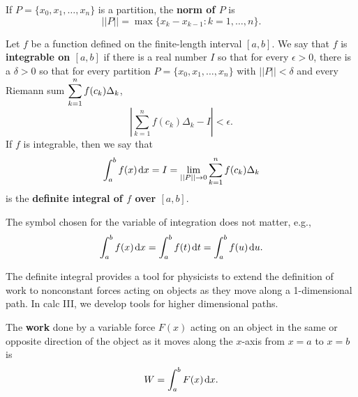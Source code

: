 \begin{definition}
If $P=\{x_0,x_1,\dots, x_n\}$ is a partition, the \textbf{norm of $P$} is 
\begin{equation*}
||P|| = \max\{x_k-x_{k-1} : k=1,\dots, n\}.
\end{equation*}
\end{definition}

\begin{definition}
Let $f$ be a function defined on the finite-length interval $[a,b]$.
We say that $f$ is \textbf{integrable on $[a,b]$} if there is a real number $I$ so that for every $\epsilon>0$, there is a $\delta>0$ so that for every partition $P=\{x_0,x_1,\dots, x_n\}$ with $||P||<\delta$ and every Riemann sum $\displaystyle\sum_{k=1}^nf(c_k)\Delta_k$,
\begin{equation*}
\left|\sum_{k=1}^nf(c_k)\Delta_k - I\right| <\epsilon.
\end{equation*}
If $f$ is integrable, then we say that
\begin{equation*}
\int_a^bf(x)\mkern 2mu \mathrm{d} x = I = \lim_{||P||\to 0}\sum_{k=1}^nf(c_k)\Delta_k
\end{equation*}
is the \textbf{definite integral of $f$ over $[a,b]$}.
\end{definition}

\begin{remark}
The symbol chosen for the variable of integration does not matter, e.g.,
\begin{equation*}
\int_a^bf(x)\mkern 2mu \mathrm{d} x = \int_a^bf(t)\mkern 2mu \mathrm{d} t = \int_a^bf(u)\mkern 2mu \mathrm{d} u.
\end{equation*}
\end{remark}

\newpage


\begin{remark}
The definite integral provides a tool for physicists to extend the definition of work to nonconstant forces acting on objects as they move along a 1-dimensional path.
In calc III, we develop tools for higher dimensional paths.
\end{remark}

\begin{definition}
The \textbf{work} done by a variable force $F(x)$ acting on an object in the same or opposite direction of the object as it moves along the $x$-axis from $x=a$ to $x=b$ is
\begin{equation*}
W=\int_a^bF(x)\mkern 2mu \mathrm{d} x.
\end{equation*}
\end{definition}

